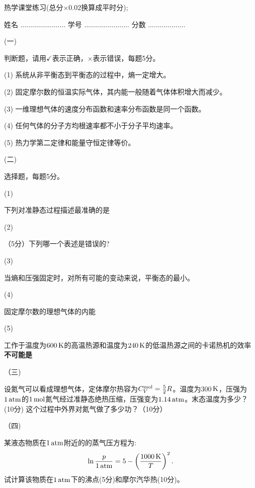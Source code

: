 \documentclass[12pt,CJK]{article}
\begin{document}
\bch
{\large 热学课堂练习(总分$\times 0.02$换算成平时分);}


姓名 ....................... {\hskip 0.5in}    学号 .......................{\hskip 0.5in}  分数 ...................


\bitem
\item[(一)]{判断题，请用$\checkmark$表示正确，$\times$表示错误，每题5分。

  \bitem
\item[(1)]{系统从非平衡态到平衡态的过程中，熵一定增大。\bropt}
\item[(2)]{固定摩尔数的恒温实际气体，其内能一般随着气体体积增大而减少。\bropt}
\item[(3)]{一维理想气体的速度分布函数和速率分布函数是同一个函数。\bropt}
\item[(4)]{任何气体的分子方均根速率都不小于分子平均速率。\bropt}
\item[(5)]{热力学第二定律和能量守恒定律等价。 \bropt}
  \eitem
}

\item[(二)]{选择题，每题5分。

  \bitem
  \item[(1)]{
  下列对准静态过程描述最准确的是 \bropt


}

\item[(2)]{
  （5分）下列哪一个表述是错误的? \bropt
  

}

\item[(3)]{
  当熵和压强固定时，对所有可能的变动来说，平衡态的\bropt 最小。

}

\item[(4)]{
  固定摩尔数的理想气体的内能 \bropt

  
}

\item[(5)]{
  工作于温度为$600\,\mathrm{K}$的高温热源和温度为$240\,\mathrm{K}$的低温热源之间的卡诺热机的效率{\bf 不可能是} \bropt

}
  \eitem
  }
\item[（三)]{设氮气可以看成理想气体，定体摩尔热容为$C_V^{\rm mol}=\frac{5}{2}R$。温度为300$\,\mathrm{K}$，压强为$1\,\mathrm{atm}$的$1\,\mathrm{mol}$氮气经过准静态绝热压缩，压强变为$1.14\,\mathrm{atm}$。末态温度为多少？(10分) 这个过程中外界对氮气做了多少功？（10分）

    \vspace{3.5in}


  }
\item[（四)]{某液态物质在$1\,\mathrm{atm}$附近的的蒸气压方程为: $$ \ln\frac{p}{1\,\mathrm{atm}} = 5 -\left(\frac{1000\,\mathrm{K}}{T}\right)^2.$$试计算该物质在$1\,\mathrm{atm}$下的沸点(5分)和摩尔汽华热(10分)。


    \vspace{2.3in}
  }
\end{document}
